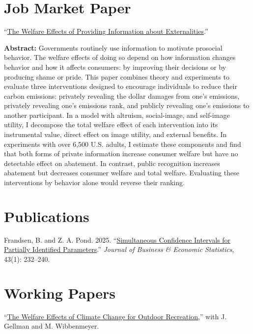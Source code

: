 \documentclass[11pt,letterpaper]{article}
\newcommand{\Abstract}[1]{\par\begin{adjust}\textbf{Abstract:} #1\end{adjust}}
\newenvironment{adjust}{\begin{list}{}{\setlength{\leftmargin}{2em}\setlength{\rightmargin}{0pt}\setlength{\topsep}{0pt}\setlength{\parsep}{0pt}\setlength{\partopsep}{0pt}}\item}{\end{list}}
\begin{document}
\section*{Job Market Paper}
``\href{https://zacpond.github.io/pond_jmp.pdf}{The Welfare Effects of Providing Information about Externalities}.''
\Abstract{Governments routinely use information to motivate prosocial behavior. The welfare effects of doing so depend on how information changes behavior and how it affects consumers: by improving their decisions or by producing shame or pride. This paper combines theory and experiments to evaluate three interventions designed to encourage individuals to reduce their carbon emissions: privately revealing the dollar damages from one's emissions, privately revealing one's emissions rank, and publicly revealing one's emissions to another participant. In a model with altruism, social-image, and self-image utility, I decompose the total welfare effect of each intervention into its instrumental value, direct effect on image utility, and external benefits. In experiments with over 6,500 U.S. adults, I estimate these components and find that both forms of private information increase consumer welfare but have no detectable effect on abatement. In contrast, public recognition increases abatement but decreases consumer welfare and total welfare. Evaluating these interventions by behavior alone would reverse their ranking.}

\section*{Publications}
Frandsen, B. and Z. A. Pond. 2025. ``\href{https://doi.org/10.1080/07350015.2024.2356083}{Simultaneous Confidence Intervals for Partially Identified Parameters}.'' \textit{Journal of Business \& Economic Statistics}, 43(1): 232--240.

\section*{Working Papers}
``\href{https://zacpond.github.io/pond_recreation.pdf}{The Welfare Effects of Climate Change for Outdoor Recreation},'' with J. Gellman and M. Wibbenmeyer.

\end{document}
